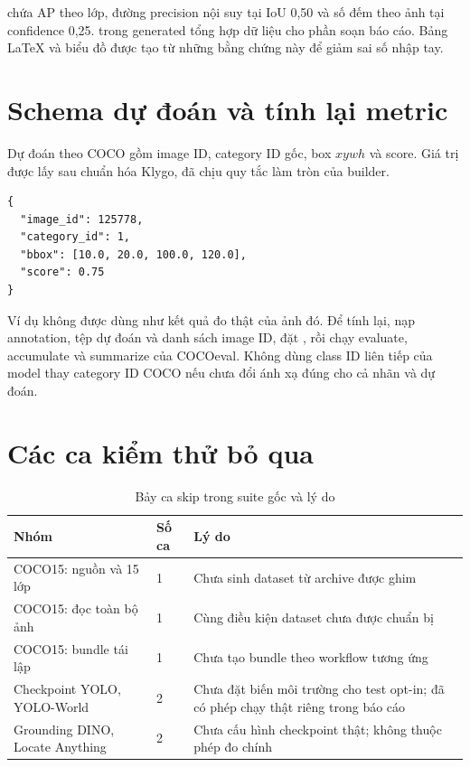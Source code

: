  chứa AP theo lớp, đường precision nội suy tại IoU 0,50 và số đếm theo ảnh tại confidence 0,25.  trong generated tổng hợp dữ liệu cho phần soạn báo cáo. Bảng LaTeX và biểu đồ được tạo từ những bằng chứng này để giảm sai số nhập tay.

\section{Schema dự đoán và tính lại metric}
Dự đoán theo COCO gồm image ID, category ID gốc, box $xywh$ và score. Giá trị được lấy sau chuẩn hóa Klygo, đã chịu quy tắc làm tròn của builder.
\begin{lstlisting}[language={},caption={Schema minh họa; giá trị bên dưới chỉ giải thích trường}]
{
  "image_id": 125778,
  "category_id": 1,
  "bbox": [10.0, 20.0, 100.0, 120.0],
  "score": 0.75
}
\end{lstlisting}
Ví dụ không được dùng như kết quả đo thật của ảnh đó. Để tính lại, nạp annotation, tệp dự đoán và danh sách image ID, đặt , rồi chạy evaluate, accumulate và summarize của COCOeval. Không dùng class ID liên tiếp của model thay category ID COCO nếu chưa đổi ánh xạ đúng cho cả nhãn và dự đoán.

\section{Các ca kiểm thử bỏ qua}
\begin{table}[H]\centering\small
\caption{Bảy ca skip trong suite gốc và lý do}
\begin{tabularx}{\textwidth}{p{4.4cm}p{1.1cm}Y}
\toprule Nhóm & Số ca & Lý do \\\midrule
COCO15: nguồn và 15 lớp & 1 & Chưa sinh dataset từ archive được ghim \\
COCO15: đọc toàn bộ ảnh & 1 & Cùng điều kiện dataset chưa được chuẩn bị \\
COCO15: bundle tái lập & 1 & Chưa tạo bundle theo workflow tương ứng \\
Checkpoint YOLO, YOLO-World & 2 & Chưa đặt biến môi trường cho test opt-in; đã có phép chạy thật riêng trong báo cáo \\
Grounding DINO, Locate Anything & 2 & Chưa cấu hình checkpoint thật; không thuộc phép đo chính \\
\bottomrule
\end{tabularx}
\end{table}

\clearpage
